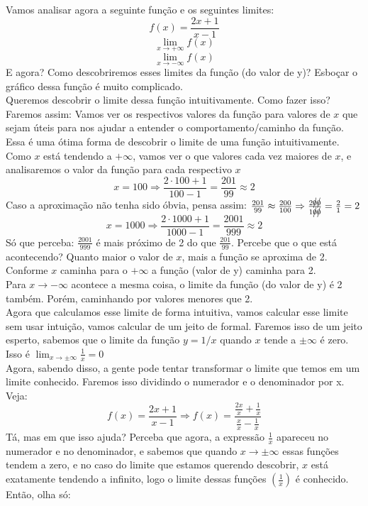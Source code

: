 \documentclass{article}
\begin{document}
Vamos analisar agora a seguinte função e os seguintes limites:
\[
f(x) = \frac{2x+1}{x-1}
\]
\[
\lim_{x \to +\infty} f(x)
\]
\[
\lim_{x \to -\infty} f(x)
\]
E agora? Como descobriremos esses limites da função (do valor de y)? Esboçar o gráfico dessa função é muito complicado.
\\[2pt]
Queremos descobrir o limite dessa função intuitivamente. Como fazer isso? Faremos assim: Vamos ver os respectivos valores da função para valores de $x$ que sejam úteis para nos ajudar a entender o comportamento/caminho da função. Essa é uma ótima forma de descobrir o limite de uma função intuitivamente.
\\[2pt]
Como $x$ está tendendo a $+\infty$, vamos ver o que valores cada vez maiores de $x$, e analisaremos o valor da função para cada respectivo $x$
\[
x = 100 \Rightarrow \frac{2\cdot 100 + 1}{100 -1} = \frac{201}{99} \approx 2
\]
Caso a aproximação não tenha sido óbvia, pensa assim: $\frac{201}{99} \approx \frac{200}{100} \Rightarrow \frac{2\cancel{0}\cancel{0}}{1\cancel{0}\cancel{0}}
=
\frac{2}{1}
=
2$
\[
x = 1000 \Rightarrow \frac{2\cdot 1000 + 1}{1000 -1} = \frac{2001}{999} \approx 2
\]
Só que perceba: $\frac{2001}{999}$ é mais próximo de 2 do que $\frac{201}{99}$. Percebe que o que está acontecendo? Quanto maior o valor de $x$, mais a função se aproxima de 2. Conforme $x$ caminha para o $+\infty$ a função (valor de y) caminha para 2.
\\[2pt]
Para $x \to -\infty$ acontece a mesma coisa, o limite da função (do valor de y) é 2 também. Porém, caminhando por valores menores que 2.
\\[2pt]
Agora que calculamos esse limite de forma intuitiva, vamos calcular esse limite sem usar intuição, vamos calcular de um jeito de formal. Faremos isso de um jeito esperto, sabemos que o limite da função $y = 1/x$ quando $x$ tende a $\pm \infty$ é zero. Isso é $\lim_{x \to \pm \infty} \frac{1}{x} = 0$ 
\\[2pt]
Agora, sabendo disso, a gente pode tentar transformar o limite que temos em um limite conhecido. Faremos isso dividindo o numerador e o denominador por x. Veja:
\[
f(x) = \frac{2x + 1}{x -1} \Rightarrow f(x) = \frac{\frac{2x}{x} + \frac{1}{x}}{\frac{x}{x} - \frac{1}{x}}
\]
Tá, mas em que isso ajuda? Perceba que agora, a expressão $\frac{1}{x}$ apareceu no numerador e no denominador, e sabemos que quando $x \to \pm \infty$ essas funções tendem a zero, e no caso do limite que estamos querendo descobrir, $x$ está exatamente tendendo a infinito, logo o limite dessas funções $(\frac{1}{x})$ é conhecido. Então, olha só:
\end{document}
